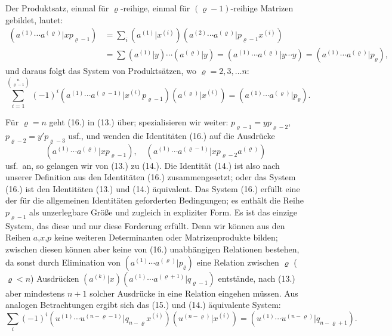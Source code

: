 \documentclass[12pt,a4paper]{article}
\begin{document}
Der Produktsatz, einmal für $\varrho$-reihige, einmal für $(\varrho-1)$-reihige Matrizen gebildet, lautet:
\begin{align*}
(a^{(1)} \cdots a^{(\varrho)} | x p_{\varrho-1}) &= \sum_{i} (a^{(1)} | x^{(i)}) (a^{(2)} \cdots a^{(\varrho)} | p_{\varrho-1} x^{(i)}) \\
&= \sum (a^{(1)} | y) \cdots (a^{(\varrho)} | y) = (a^{(1)} \cdots a^{(\varrho)} | y \cdots y) = (a^{(1)} \cdots a^{(\varrho)} | p_{\varrho}),
\end{align*}
und daraus folgt das System von Produktsätzen, wo $\varrho = 2, 3, \ldots n$:
\begin{equation}\tag{16}
\sum_{i=1}^{\binom{n}{\varrho-1}} (-1)^{i} (a^{(1)} \cdots a^{(\varrho-1)} | x^{(i)} p_{\varrho-1}) (a^{(\varrho)} | x^{(i)}) = (a^{(1)} \cdots a^{(\varrho)} | p_{\varrho}).
\end{equation}

Für $\varrho = n$ geht (16.) in (13.) über; spezialisieren wir weiter: $p_{\varrho-1} = y p_{\varrho-2}$, $p_{\varrho-2} = y' p_{\varrho-3}$ usf., und wenden die Identitäten (16.) auf die Ausdrücke
\begin{equation*}
(a^{(1)} \cdots a^{(\varrho)} | x p_{\varrho-1}), \quad (a^{(1)} \cdots a^{(\varrho-1)} | x p_{\varrho-2} a^{(\varrho)})
\end{equation*}
usf.\ an, so gelangen wir von (13.) zu (14.). Die Identität (14.) ist also nach unserer Definition aus den Identitäten (16.) zusammengesetzt; oder das System (16.) ist den Identitäten (13.) und (14.) äquivalent. Das System (16.) erfüllt eine der für die allgemeinen Identitäten geforderten Bedingungen; es enthält die Reihe $p_{\varrho-1}$ als unzerlegbare Größe und zugleich in expliziter Form. Es ist das einzige System, das diese und nur diese Forderung erfüllt. Denn wir können aus den Reihen $a$,$x$,$p$ keine weiteren Determinanten oder Matrizenprodukte bilden; zwischen diesen können aber keine von (16.) unabhängigen Relationen bestehen, da sonst durch Elimination von $(a^{(1)} \cdots a^{(\varrho)} | p_{\varrho})$ eine Relation zwischen $\varrho$ ($\varrho < n$) Ausdrücken $(a^{(k)} | x)(a^{(1)} \cdots a^{(\varrho+1)} | q_{\varrho-1})$ entstände, nach (13.) aber mindestens $n+1$ solcher Ausdrücke in eine Relation eingehen müssen. Aus analogen Betrachtungen ergibt sich das (15.) und (14.) äquivalente System:
\begin{equation}\tag{17}
\sum_{i} (-1)^{i} (u^{(1)} \cdots u^{(n-\varrho-1)} | q_{n-\varrho} x^{(i)}) (u^{(n-\varrho)} | x^{(i)}) = (u^{(1)} \cdots u^{(n-\varrho)} | q_{n-\varrho+1}).
\end{equation}
\end{document}
